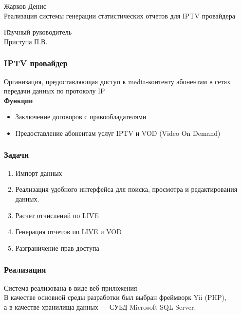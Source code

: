 \documentclass{beamer}
\begin{document}
\sloppy

\begin{frame}
\begin{center}
Жарков Денис\\
\vspace{1cm}
{\Large Реализация системы генерации статистических отчетов для IPTV провайдера}
\end{center}
\begin{tabbing}
\hspace{6.5cm} \= Научный руководитель\\
\> Приступа П.В.\\
\end{tabbing}
\end{frame}

\begin{frame}
\frametitle{IPTV провайдер}
Организация, предоставляющая доступ к media-контенту абонентам в сетях передачи данных по протоколу IP
\\
\vspace{0.3cm}
{\bf Функции}
\begin{itemize}
\item{
Заключение договоров с правообладателями
}
\item{
Предоставление абонентам услуг IPTV и VOD (Video On Demand)
}
\end{itemize}
\end{frame}

\begin{frame}
\frametitle{Задачи}
\begin{enumerate}
\item {
Импорт данных
}
\item {
Реализация удобного интерфейса для поиска, просмотра и редактирования данных.
}
\item {
Расчет отчислений по LIVE
}
\item {
Генерация отчетов по LIVE и VOD
}
\item {
Разграничение прав доступа
}
\end{enumerate}
\end{frame}

\begin{frame}
\frametitle{Реализация}

Система реализована в виде веб-приложения\\
В качестве основной среды разработки был выбран фреймворк Yii (PHP),\\
а в качестве хранилища данных --- СУБД Microsoft SQL Server.\\

\end{frame}
\end{document}
